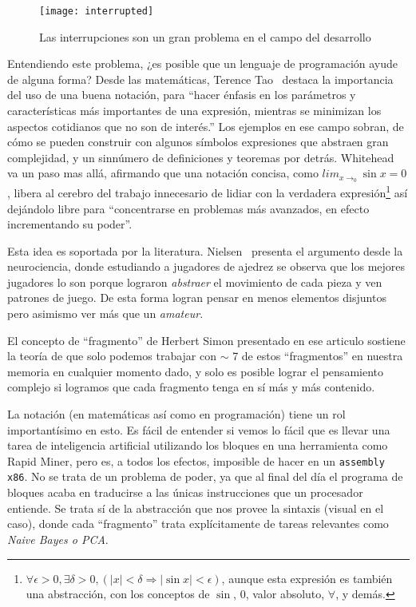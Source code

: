 \documentclass[12pt]{article}
\begin{document}
\begin{figure}[ht]
    \begin{center}
        \texttt{[image: interrupted]}
        \caption{Las interrupciones son un gran problema en el campo del desarrollo}
	\label{fig:interrupt}
    \end{center}
\end{figure}

Entendiendo este problema, ¿es posible que un lenguaje de programación ayude de
alguna forma?
Desde las matemáticas, Terence Tao~\autocite{goodnotation} destaca la
importancia del uso de una buena notación, para ``hacer énfasis en los
parámetros y características más importantes de una expresión, mientras se
minimizan los aspectos cotidianos que no son de interés.''
Los ejemplos en ese campo sobran, de cómo se pueden construir con algunos
símbolos expresiones que abstraen gran complejidad, y un sinnúmero de definiciones
y teoremas por detrás.
Whitehead~\autocite{intromath} va un paso mas allá, afirmando que una notación
concisa, como \(lim_{x\to_0} \sin x = 0\), libera al cerebro del trabajo innecesario
de lidiar con la verdadera
expresión\footnote{\(\forall \epsilon > 0, \exists \delta > 0, (|x| < \delta \Rightarrow |\sin x| < \epsilon)\), aunque esta expresión es también una abstracción, con
los conceptos de \(\sin\), \(0\), valor absoluto, \(\forall\), y demás.}
así dejándolo libre para ``concentrarse en problemas más avanzados, en
efecto incrementando su poder''.

Esta idea es soportada por la literatura. Nielsen~\autocite{augmentingcognition}
presenta el argumento desde la neurociencia, donde estudiando a jugadores de ajedrez
se observa que los mejores jugadores lo son porque lograron \emph{abstraer} el movimiento
de cada pieza y ven patrones de juego. De esta forma logran pensar en menos
elementos disjuntos pero asimismo ver más que un \emph{amateur}.

El concepto de ``fragmento'' de Herbert Simon presentado en ese articulo
sostiene la teoría de que solo podemos trabajar con \(\sim\) 7 de estos ``fragmentos''
en nuestra memoria en cualquier momento dado, y solo es posible lograr el
pensamiento complejo si logramos que cada fragmento tenga en sí más y más
contenido.

La notación (en matemáticas así como en programación) tiene un rol
importantísimo en esto.
Es fácil de entender si vemos lo fácil que es llevar una tarea de inteligencia
artificial utilizando los bloques en una herramienta como Rapid Miner, pero es,
a todos los efectos, imposible de hacer en un \texttt{assembly x86}.
No se trata de un problema de poder, ya que al final del día el programa de
bloques acaba en traducirse a las únicas instrucciones que un procesador
entiende. Se trata sí de la abstracción que nos provee la sintaxis (visual en
el caso), donde cada ``fragmento'' trata explícitamente de tareas relevantes
como \emph{Naive Bayes o PCA}.
\end{document}
